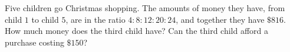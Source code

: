 Five children go Christmas shopping. The amounts of money they have, from child $1$ to child $5$, are in the ratio $4:8:12:20:24$, and together they have $\$816$. How much money does the third child have? Can the third child afford a purchase costing $\$150$?
